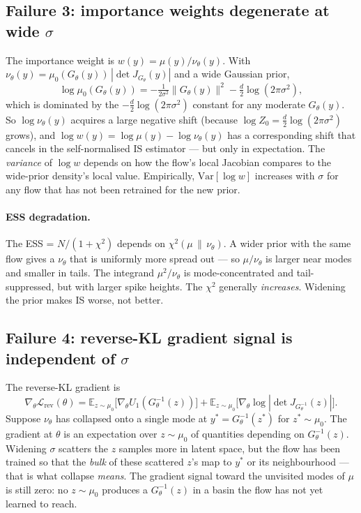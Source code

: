 \documentclass[11pt,letterpaper]{article}
\newcommand{\E}{\mathbb{E}}
\theoremstyle{plain}
\begin{document}
\subsection{Failure 3: importance weights degenerate at wide $\sigma$}

The importance weight is $w(y) = \mu(y)/\nu_\theta(y)$. With
$\nu_\theta(y) = \mu_0(G_\theta(y))\,|\det J_{G_\theta}(y)|$ and a wide
Gaussian prior,
\[
  \log\mu_0(G_\theta(y)) = -\tfrac{1}{2\sigma^2}\|G_\theta(y)\|^2 - \tfrac{d}{2}\log(2\pi\sigma^2),
\]
which is dominated by the $-\tfrac{d}{2}\log(2\pi\sigma^2)$ constant for any
moderate $G_\theta(y)$. So $\log\nu_\theta(y)$ acquires a large negative
shift (because $\log Z_0 = \frac{d}{2}\log(2\pi\sigma^2)$ grows), and
$\log w(y) = \log\mu(y) - \log\nu_\theta(y)$ has a corresponding shift that
cancels in the self-normalised IS estimator --- but only in expectation. The
\emph{variance} of $\log w$ depends on how the flow's local Jacobian compares
to the wide-prior density's local value. Empirically, $\mathrm{Var}[\log w]$
increases with $\sigma$ for any flow that has not been retrained for the new
prior.

\paragraph{ESS degradation.} The ESS = $N/(1+\chi^2)$ depends on
$\chi^2(\mu\,\|\,\nu_\theta)$. A wider prior with the same flow gives a
$\nu_\theta$ that is uniformly more spread out --- so $\mu/\nu_\theta$ is
larger near modes and smaller in tails. The integrand $\mu^2/\nu_\theta$ is
mode-concentrated and tail-suppressed, but with larger spike heights. The
$\chi^2$ generally \emph{increases}. Widening the prior makes IS worse, not
better.

\subsection{Failure 4: reverse-KL gradient signal is independent of $\sigma$}

The reverse-KL gradient is
\[
  \nabla_\theta \mathcal L_{\mathrm{rev}}(\theta) = \E_{z\sim\mu_0}\!\big[\nabla_\theta U_1(G^{-1}_\theta(z))\big] + \E_{z\sim\mu_0}\!\big[\nabla_\theta\log|\det J_{G^{-1}_\theta}(z)|\big].
\]
Suppose $\nu_\theta$ has collapsed onto a single mode at $y^* = G^{-1}_\theta(z^*)$
for $z^*\sim\mu_0$. The gradient at $\theta$ is an expectation over $z\sim\mu_0$
of quantities depending on $G^{-1}_\theta(z)$. Widening $\sigma$ scatters the
$z$ samples more in latent space, but the flow has been trained so that the
\emph{bulk} of these scattered $z$'s map to $y^*$ or its neighbourhood ---
that is what collapse \emph{means}. The gradient signal toward the unvisited
modes of $\mu$ is still zero: no $z\sim\mu_0$ produces a $G^{-1}_\theta(z)$ in
a basin the flow has not yet learned to reach.
\end{document}
